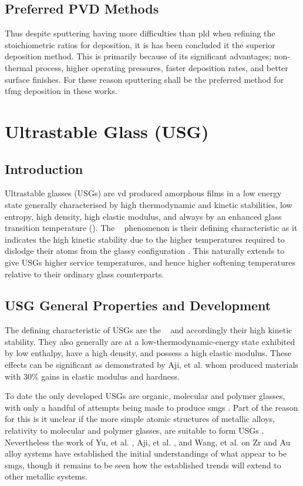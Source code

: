 \documentclass[a4paper,12pt,oneside]{report}%
\begin{document}
\subsection{Preferred PVD Methods}
Thus despite sputtering having more difficulties than \gls{pld} when refining the stoichiometric ratios for deposition, it is has been concluded it the superior deposition method. This is primarily because of its significant advantages; non-thermal process, higher operating pressures, faster deposition rates, and better surface finishes. For these reason sputtering shall be the preferred method for \gls{tfmg} deposition in these works. 

\section{Ultrastable Glass (USG)} 
\subsection{Introduction}
Ultrastable glasses (USGs) are \gls{vd} produced amorphous films in a low energy state generally characterised by high thermodynamic and kinetic stabilities, low entropy, high density, high elastic modulus, and always by an enhanced glass transition temperature (\dTg). The \dTg~ phenomenon is their defining characteristic as it indicates the high kinetic stability due to the higher temperatures required to dislodge their atoms from the glassy configuration \cite{Swallen2007, Dawson2011}. This naturally extends to give USGs higher service temperatures, and hence higher softening temperatures relative to their ordinary glass counterparts. 

\subsection{USG General Properties and Development}
The defining characteristic of USGs are the \dTg~ and accordingly their high kinetic stability. They also generally are at a low-thermodynamic-energy state exhibited by low enthalpy, have a high density, and possess a high elastic modulus. These effects can be significant as demonstrated by Aji, et al. \cite{Aji2013} whom produced materials with 30\% gains in elastic modulus and hardness. 

To date the only developed USGs are organic, molecular and polymer glasses, with only a handful of attempts being made to produce \glspl{smg} \cite{Aji2013, Yu2013, Wang2014}. Part of the reason for this is it unclear if the more simple atomic structures of metallic alloys, relativity to molecular and polymer glasses, are suitable to form USGs \cite{Yu2013}. Nevertheless the work of Yu, et al. \cite{Yu2013}, Aji, et al. \cite{Aji2013}, and Wang, et al. \cite{Wang2014} on Zr and Au alloy systems have established the initial understandings of what appear to be \glspl{smg}, though it remains to be seen how the established trends will extend to other metallic systems. 
\end{document}
